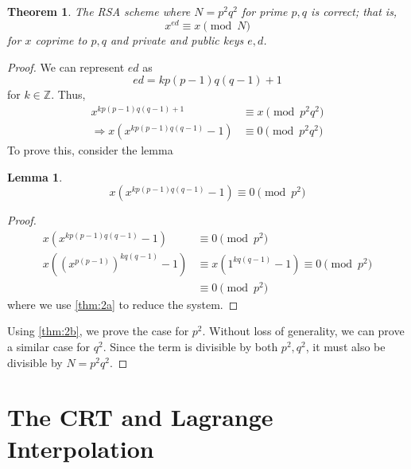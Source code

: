 \documentclass{article}
\newtheorem{theorem}{Theorem}
\newtheorem{lemma}{Lemma}
\newcommand{\Z}{\mathbb{Z}}
\begin{document}
\subsection{}

\begin{theorem}
    The RSA scheme where \(N = p^2 q^2\) for prime \(p, q\) is correct; that is,
    \begin{equation}
        x^{ed} \equiv x \pmod{N}
    \end{equation}
    for \(x\) coprime to \(p, q\) and private and public keys \(e, d\).
\end{theorem}
\begin{proof}
    We can represent \(ed\) as
    \begin{equation}
        ed = k p(p - 1) q(q - 1) + 1
    \end{equation}
    for \(k \in \Z\).
    Thus,
    \begin{align}
        x^{k p(p - 1) q(q - 1) + 1} &\equiv x \pmod{p^2 q^2} \\
        \Rightarrow x (x^{k p(p - 1) q(q - 1)} - 1) &\equiv 0 \pmod{p^2 q^2}
    \end{align}
    To prove this, consider the lemma
    \begin{lemma} \label{thm:2b}
        \begin{equation}
            x (x^{k p(p - 1) q(q - 1)} - 1) \equiv 0 \pmod{p^2}
        \end{equation}
    \end{lemma}
    \begin{proof}
        \begin{align}
            x (x^{k p(p - 1) q(q - 1)} - 1) &\equiv 0 \pmod{p^2} \\
            x \left((x^{p(p - 1)})^{k q(q - 1)} - 1\right) &\equiv x (1^{k q(q - 1)} - 1) \equiv 0 \pmod{p^2} \\
            &\equiv 0 \pmod{p^2}
        \end{align}
        where we use \autoref{thm:2a} to reduce the system.
    \end{proof}
    Using \autoref{thm:2b}, we prove the case for \(p^2\).
    Without loss of generality, we can prove a similar case for \(q^2\).
    Since the term is divisible by both \(p^2, q^2\), it must also be divisible by \(N = p^2 q^2\).
\end{proof}

\section{The CRT and Lagrange Interpolation}
\end{document}
